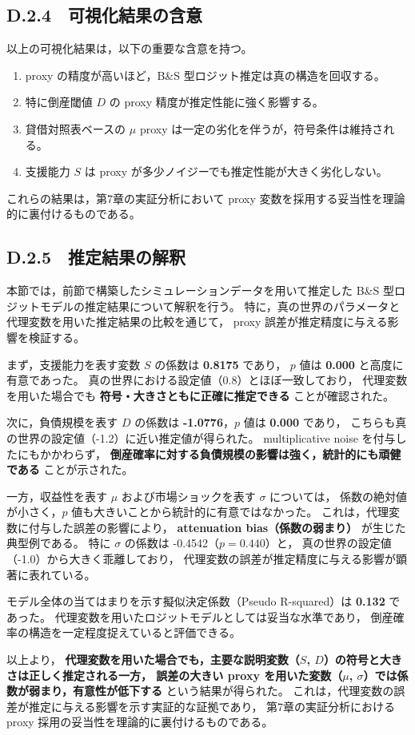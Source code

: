 \subsection*{D.2.4　可視化結果の含意}

以上の可視化結果は，以下の重要な含意を持つ。

\begin{enumerate}
    \item proxy の精度が高いほど，B\&S 型ロジット推定は真の構造を回収する。
    \item 特に倒産閾値 $D$ の proxy 精度が推定性能に強く影響する。
    \item 貸借対照表ベースの $\mu$ proxy は一定の劣化を伴うが，符号条件は維持される。
    \item 支援能力 $S$ は proxy が多少ノイジーでも推定性能が大きく劣化しない。
\end{enumerate}

これらの結果は，第7章の実証分析において
proxy 変数を採用する妥当性を理論的に裏付けるものである。

\subsection*{D.2.5　推定結果の解釈}

本節では，前節で構築したシミュレーションデータを用いて推定した
B\&S 型ロジットモデルの推定結果について解釈を行う。
特に，真の世界のパラメータと代理変数を用いた推定結果の比較を通じて，
proxy 誤差が推定精度に与える影響を検証する。

まず，支援能力を表す変数 $S$ の係数は \textbf{0.8175} であり，
$p$ 値は \textbf{0.000} と高度に有意であった。
真の世界における設定値（0.8）とほぼ一致しており，
代理変数を用いた場合でも \textbf{符号・大きさともに正確に推定できる} ことが確認された。

次に，負債規模を表す $D$ の係数は \textbf{-1.0776}，$p$ 値は \textbf{0.000} であり，
こちらも真の世界の設定値（-1.2）に近い推定値が得られた。
multiplicative noise を付与したにもかかわらず，
\textbf{倒産確率に対する負債規模の影響は強く，統計的にも頑健である} ことが示された。

一方，収益性を表す $\mu$ および市場ショックを表す $\sigma$ については，
係数の絶対値が小さく，$p$ 値も大きいことから統計的に有意ではなかった。
これは，代理変数に付与した誤差の影響により，
\textbf{attenuation bias（係数の弱まり）} が生じた典型例である。
特に $\sigma$ の係数は -0.4542（$p=0.440$）と，
真の世界の設定値（-1.0）から大きく乖離しており，
代理変数の誤差が推定精度に与える影響が顕著に表れている。

モデル全体の当てはまりを示す擬似決定係数（Pseudo R-squared）は \textbf{0.132} であった。
代理変数を用いたロジットモデルとしては妥当な水準であり，
倒産確率の構造を一定程度捉えていると評価できる。

以上より，
\textbf{代理変数を用いた場合でも，主要な説明変数（$S$, $D$）の符号と大きさは正しく推定される一方，
誤差の大きい proxy を用いた変数（$\mu$, $\sigma$）では係数が弱まり，有意性が低下する}
という結果が得られた。
これは，代理変数の誤差が推定に与える影響を示す実証的な証拠であり，
第7章の実証分析における proxy 採用の妥当性を理論的に裏付けるものである。
